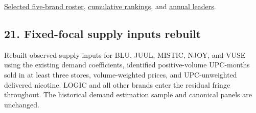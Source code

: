 \documentclass[10pt,]{article}
\begin{document}
\href{../../output/dynamic_entry_exit/focal_brand_selection_2026-11-05/selected_five_focal_brands.csv}{Selected
five-brand roster},
\href{../../output/dynamic_entry_exit/focal_brand_selection_2026-11-05/demand_eligible_cumulative_rankings.csv}{cumulative
rankings}, and
\href{../../output/dynamic_entry_exit/focal_brand_selection_2026-11-05/demand_eligible_annual_leaders.csv}{annual
leaders}.

\subsection{21. Fixed-focal supply inputs
rebuilt}\label{fixed-focal-supply-inputs-rebuilt}

Rebuilt observed supply inputs for BLU, JUUL, MISTIC, NJOY, and VUSE
using the existing demand coefficients, identified positive-volume
UPC-months sold in at least three stores, volume-weighted prices, and
UPC-unweighted delivered nicotine. LOGIC and all other brands enter the
residual fringe throughout. The historical demand estimation sample and
canonical panels are unchanged.
\end{document}
